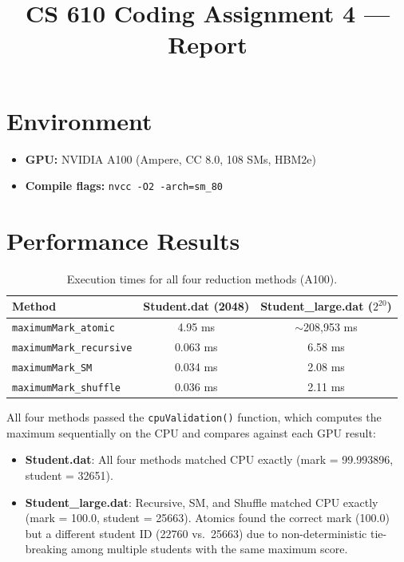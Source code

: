 \documentclass[11pt]{article}
\title{CS 610 Coding Assignment 4 --- Report}
\author{}
\date{}
\begin{document}
\maketitle

\section*{Environment}
\begin{itemize}
  \item \textbf{GPU:} NVIDIA A100 (Ampere, CC 8.0, 108 SMs, HBM2e)
  \item \textbf{Compile flags:} \texttt{nvcc -O2 -arch=sm\_80}
\end{itemize}

\section*{Performance Results}

\begin{table}[h]
\centering
\caption{Execution times for all four reduction methods (A100).}
\begin{tabular}{lcc}
\toprule
\textbf{Method} & \textbf{Student.dat (2048)} & \textbf{Student\_large.dat ($2^{20}$)} \\
\midrule
\texttt{maximumMark\_atomic}     & 4.95 ms        & $\sim$208{,}953 ms \\
\texttt{maximumMark\_recursive}  & 0.063 ms       & 6.58 ms            \\
\texttt{maximumMark\_SM}         & 0.034 ms       & 2.08 ms            \\
\texttt{maximumMark\_shuffle}    & 0.036 ms       & 2.11 ms            \\
\bottomrule
\end{tabular}
\end{table}

\noindent All four methods passed the \texttt{cpuValidation()} function, which computes the maximum
sequentially on the CPU and compares against each GPU result:
\begin{itemize}
  \item \textbf{Student.dat}: All four methods matched CPU exactly (mark = 99.993896, student = 32651).
  \item \textbf{Student\_large.dat}: Recursive, SM, and Shuffle matched CPU exactly (mark = 100.0, student = 25663).
        Atomics found the correct mark (100.0) but a different student ID (22760 vs.\ 25663)
        due to non-deterministic tie-breaking among multiple students with the same maximum score.
\end{itemize}
\end{document}
